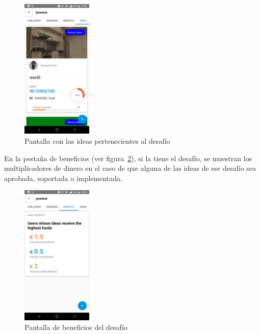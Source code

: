 \begin{figure}[!h]
	\begin{center}
		\includegraphics[width=0.3\textwidth]{./img/anexo1/ver_desafio_ideas.png}
		\caption{Pantalla con las ideas pertenecientes al desafío}
		\label{fig:ver_desafio_ideas}
	\end{center}
\end{figure}

En la pestaña de beneficios (ver figura~\ref{fig:ver_desafio_beneficios}), si la tiene el desafío, 
se muestran los multiplicadores de dinero en el caso de que alguna de las ideas de ese 
desafío sea aprobada, soportada o implementada.

\begin{figure}[!h]
	\begin{center}
		\includegraphics[width=0.3\textwidth]{./img/anexo1/ver_desafio_beneficios.png}
		\caption{Pantalla de beneficios del desafío}
		\label{fig:ver_desafio_beneficios}
	\end{center}
\end{figure}



